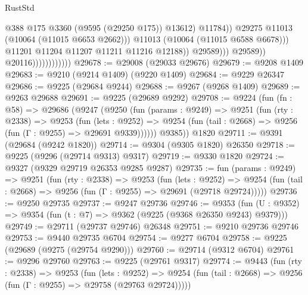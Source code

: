 \begin{lexlean}{RustStd}
\begin{coremodule}
                                                    @388
                                                    @175
                                                    @3360
                                                    (@9595 (@29250 @175))
                                                    @13612)
                                                  @11784))
                                              @29275
                                              @11013
                                              (@10064 (@11015 @6653 @2662)))
                                            @11013
                                            (@10064 (@11015 @6588 @6678)))
                                          @11201
                                          @11204
                                          @11207
                                          @11211
                                          @11216
                                          @12188))
                                      @29589)))
                                @29589))
                            @20116))))))))))))
@29678 := @29008 (@29033 @29676)
@29679 := @9208 @1409
@29683 := @9210 (@9214 @1409) (@9220 @1409)
@29684 := @9229 @26347
@29686 := @9225 (@29684 @9244)
@29688 := @9267 (@9268 @1409)
@29689 := @9263 @29688
@29691 := @9225 (@29689 @9292)
@29708 := @9224
    (fun (fn : @58) =>
    @29686
      (@9247
        (@9250
          (fun (params : @9249) =>
          @9251
            (fun (rty : @2338) =>
            @9253
              (fun (lets : @9252) =>
              @9254 (fun (tail : @2668) => @9256 (fun (Γ : @9255) => @29691 @9339))))))
        @9385))
    @1820
@29711 := @9391 (@29684 (@9242 @1820))
@29714 := @9304 (@9305 @1820) @26350
@29718 := @9225 (@9296 (@29714 @9313) @9317)
@29719 := @9330 @1820
@29724 := @9327 (@9329 @29719 @26353 @9285 @9287)
@29735 := fun (params : @9249) =>
  @9251
    (fun (rty : @2338) =>
    @9253
      (fun (lets : @9252) =>
      @9254 (fun (tail : @2668) => @9256 (fun (Γ : @9255) => @29691 (@29718 @29724)))))
@29736 := @9250 @29735
@29737 := @9247 @29736
@29746 := @9353
    (fun (U : @9352) => @9354 (fun (t : @7) => @9362 (@9225 (@9368 @26350 @9243) @9379)))
@29749 := @29711 (@29737 @29746) @26348
@29751 := @9210 @29736 @29746
@29753 := @9440 @29735 @6704
@29754 := @9277 @6704
@29758 := @9225 (@29689 (@9275 (@29754 @9290)))
@29760 := @29714 (@9312 @6704)
@29761 := @9296 @29760
@29763 := @9225 (@29761 @9317)
@29774 := @9443
    (fun (rty : @2338) =>
    @9253
      (fun (lets : @9252) =>
      @9254 (fun (tail : @2668) => @9256 (fun (Γ : @9255) => @29758 (@29763 @29724)))))

\end{coremodule}
\end{lexlean}
